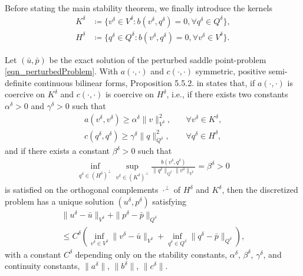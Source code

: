 \documentclass[journal]{IEEEtran}
\newcommand{\paren}[1]{\left(#1\right)}
\newcommand{\Def}{\coloneqq}
\begin{document}


Before stating the main stability theorem, we finally introduce the kernels
\begin{align}
K^\delta &\Def \{v^\delta\in V^\delta : b(v^\delta,q^\delta) = 0, \forall q^\delta\in Q^\delta\},\\
H^\delta &\Def \{q^\delta\in Q^\delta : b(v^\delta,q^\delta) = 0, \forall v^\delta\in V^\delta\}.
\end{align}

Let $(\bar u,\bar p)$ be the exact solution of the perturbed saddle point-problem \eqref{eqn_perturbedProblem}. With $a(\cdot,\cdot)$ and $c(\cdot,\cdot)$ symmetric, positive semi-definite continuous bilinear forms, Proposition 5.5.2. in \cite{brezziBook} states that, if $a(\cdot,\cdot)$ is coercive on $K^\delta$ and $c(\cdot,\cdot)$ is coercive on $H^\delta$, i.e., if there exists two constants $\alpha^\delta>0$ and $\gamma^\delta>0$ such that
\begin{align}
a(v^\delta,v^\delta) \ge \alpha^\delta \|v\|_{V^\delta}^2 ,\quad &\forall v^\delta\in K^\delta,\label{coercivenessoOnKernels_a}\\
c(q^\delta,q^\delta) \ge \gamma^\delta \|q\|_{Q^\delta}^2, \quad &\forall q^\delta\in H^\delta,\label{coercivenessoOnKernels_c}
\end{align}
and if there exists a constant $\beta^\delta>0$ such that
\begin{align}\label{infsupCondition}
\inf_{q^\delta\in (H^\delta)^\perp} \sup_{v^\delta\in (K^\delta)^\perp} \frac{b(v^\delta,q^\delta)}{\|q^\delta\|_{Q^\delta} \|v^\delta\|_{V^\delta}} = \beta^\delta > 0
\end{align}
is satisfied on the orthogonal complements $\cdot^\perp$ of $H^\delta$ and $K^\delta$, then the discretized problem has a unique solution $(u^\delta,p^\delta)$ satisfying
\begin{multline}\label{infsupCondition_convergence}
\|u^\delta - \bar u\|_{V^\delta} + \|p^\delta - \bar p\|_{Q^\delta} \\
\le C^\delta \paren{\inf_{v^\delta\in V^\delta} \|v^\delta-\bar u\|_{V^\delta} + \inf_{q^\delta\in Q^\delta} \|q^\delta-\bar p\|_{Q^\delta}},
\end{multline}
with a constant $C^\delta$ depending only on the stability constants, $\alpha^\delta$, $\beta^\delta$, $\gamma^\delta$, and continuity constants, $\|a^\delta\|$, $\|b^\delta\|$, $\|c^\delta\|$.
\end{document}

